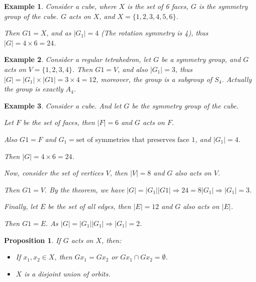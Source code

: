 \documentclass{article}
\theoremstyle{MyNonumberplain}
\theoremstyle{break}
\theoremstyle{break}
\newtheorem{proposition}{Proposition}[section]
\newtheorem{example}{Example}[section]
\theoremstyle{break}
\theoremstyle{definition}
\theoremstyle{break}
\begin{document}
\begin{expbox}
    \begin{example}
        Consider a cube, where $X$ is the set of 6 faces, $G$ is the symmetry group of
the cube. $G$ acts on $X$, and $X = \{ 1, 2, 3, 4, 5, 6 \}$.

Then $G 1 = X$, and as $| G_1 | = 4$ (The rotation symmetry is 4), thus $| G |
= 4 \times 6 = 24$.
    \end{example}
\end{expbox}

\begin{expbox}
    \begin{example}
        Consider a regular tetrahedron, let $G$ be a symmetry group, and $G$ acts on
$V = \{ 1, 2, 3, 4 \}$. Then $G 1 = V$, and also $| G_1 | = 3$, thus $| G | =
| G_1 | \times | G 1 | = 3 \times 4 = 12$, moreover, the group is a subgroup
of $S_4$. Actually the group is exactly $A_4$.
    \end{example}
\end{expbox}

\begin{expbox}
    \begin{example}
        Consider a cube. And let $G$ be the symmetry group of the cube.\bigskip

        Let $F$ be the set of faces, then $| F | = 6$ and $G$ acts on $F$.\bigskip

        Also $G 1 = F$ and $G_1 = \text{set of symmetries that preserves face 1}$,
        and $| G_1 | = 4$.\bigskip

        Then $| G | = 4 \times 6 = 24$.\bigskip

        Now, consider the set of vertices $V$, then $| V | = 8$ and $G$ also acts on
        $V$.\bigskip

        Then $G 1 = V$. By the theorem, we have $| G | = | G_1 |  | G 1 | \Rightarrow
        24 = 8 | G_1 | \Rightarrow | G_1 | = 3$.\bigskip

        Finally, let $E$ be the set of all edges, then $| E | = 12$ and $G$ also acts
        on $| E |$.\bigskip

        Then $G 1 = E$. As $| G | = | G_1 |  | G_1 | \Rightarrow | G_1 | = 2$.
    \end{example}
\end{expbox}

\begin{thmbox}
    \begin{proposition}
        If $G$ acts on $X$, then:\bigskip
        \begin{itemize}
        \item If $x_1, x_2 \in X$, then $G x_1 = G x_2$ or $G x_1 \cap G x_2 =
        \emptyset$.\bigskip
        
        \item $X$ is a disjoint union of orbits.
        \end{itemize}
    \end{proposition}
\end{thmbox}
\end{document}
